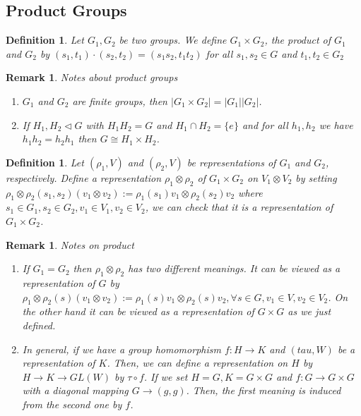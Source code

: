 \documentclass[letterpaper, leqno, 12pt]{article}
\newcommand{\fin}{\qquad \quad \hfill \framebox[1.75mm][l]{\,}}
\providecommand{\abs}[1]{\left\lvert#1\right\rvert}
\theoremstyle{stdthm}
\theoremstyle{stddef}
\newtheorem{defn}[thm]{Definition}
\newtheorem{rem}[thm]{Remark} %
\theoremstyle{stdnonum}
\theoremstyle{stdqands}
\theoremstyle{stdbold}
\begin{document}
\subsection*{Product Groups}
\begin{defn}
Let $G_1, G_2$ be two groups. We define $G_1 \times G_2$, the product of $G_1$ and $G_2$ by  $(s_1,t_1)\cdot (s_2,t_2) = (s_1s_2, t_1t_2)$ for all $s_1,s_2 \in G$ and  $ t_1,t_2 \in G_2$
\end{defn}

\begin{rem} Notes about product groups\\
\begin{enumerate}
\item $G_1$ and $G_2$ are finite groups, then $\abs{G_1 \times G_2} = \abs{G_1}\abs{G_2}$.
\item If $H_1, H_2 \lhd G$ with $H_1H_2 = G$ and $H_1 \cap H_2 = \{ e\}$ and for all $h_1,h_2$ we have $h_1h_2 = h_2h_1$ then $G \cong H_1 \times H_2$. 
\end{enumerate} 
\end{rem}

\begin{defn}
Let $(\rho_1,V)$ and $(\rho_2,V)$ be representations of $G_1$ and $G_2$, respectively. Define a representation $\rho_1 \otimes \rho_2$ of $G_1 \times G_2$ on $V_1 \otimes V_2$ by setting $\rho_1 \otimes \rho_2 (s_1,s_2)(v_1\otimes v_2) := \rho_1(s_1) v_1 \otimes \rho_2 (s_2)v_2$ where $s_1 \in G_1, s_2 \in G_2, v_1\in V_1, v_2 \in V_2$, we can check that it is a representation of $G_1 \times G_2$. 
\end{defn}

\begin{rem} Notes on product \\
\begin{enumerate}
\item If $G_1= G_2$ then $\rho_1 \otimes \rho_2$ has two different meanings. It can be viewed as a representation of $G$ by  $\rho_1 \otimes \rho_2 (s)(v_1 \otimes v_2) := \rho_1(s)v_1 \otimes \rho_2(s)v_2 , \forall s\in G, v_1 \in V, v_2 \in V_2$. On the other hand it can be viewed as a representation of $G \times G$ as we just defined. 
\item In general, if we have a  group homomorphism $f: H\rightarrow K$ and $(tau,W)$ be a representation of $K$. Then, we can define a representation on $H$ by $H\rightarrow K \rightarrow GL(W)$ by $\tau \circ f$. If we set $H = G, K = G\times G$ and $f: G \rightarrow G \times G$ with a diagonal mapping $G \rightarrow (g,g)$. Then, the first meaning is induced from the second one by $f$. 
\end{enumerate}
\end{rem}
\end{document}
